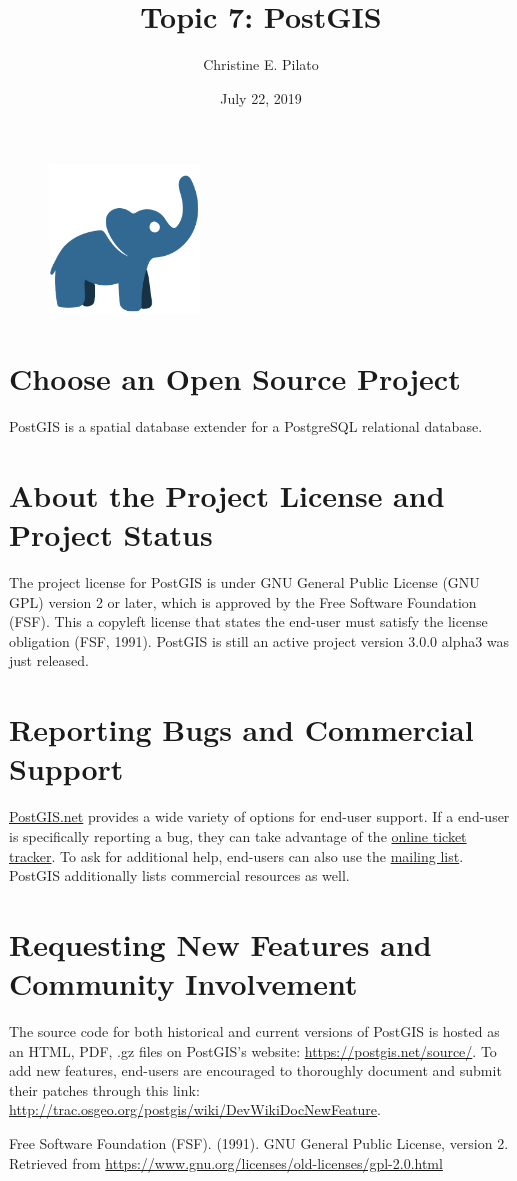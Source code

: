 \documentclass[11pt]{article}
\title{Topic 7: PostGIS}
\author{Christine E. Pilato}
\date{July 22, 2019}
\begin{document}
\begin{figure}
    \centering
    \includegraphics[width=4cm]{postgis.png}
\end{figure}
\maketitle

\section*{Choose an Open Source Project}
PostGIS is a spatial database extender for a PostgreSQL relational database.
\section*{About the Project License and Project Status}
The project license for PostGIS is under GNU General Public License (GNU GPL) version 2 or later, which is approved by the Free Software Foundation (FSF). This a copyleft license that states the end-user must satisfy the license obligation (FSF, 1991). PostGIS is still an active project \textemdash version 3.0.0 alpha3 was just released.
\section*{Reporting Bugs and Commercial Support}
\href{https://postgis.net/support/}{PostGIS.net} provides a wide variety of options for end-user support. If a end-user is specifically reporting a bug, they can take advantage of the \href{http://trac.osgeo.org/postgis}{online ticket tracker}. To ask for additional help, end-users can also use the \href{https://lists.osgeo.org/mailman/listinfo/postgis-users}{mailing list}. PostGIS additionally lists commercial resources as well.
\section*{Requesting New Features and Community Involvement}
The source code for both historical and current versions of PostGIS is hosted as an HTML, PDF, .gz files on PostGIS's website: \url{https://postgis.net/source/}. To add new features, end-users are encouraged to thoroughly document and submit their patches through this link: \url{http://trac.osgeo.org/postgis/wiki/DevWikiDocNewFeature}.

\begin{thebibliography}
 Free Software Foundation (FSF). (1991). GNU General Public License, version 2. Retrieved from \url{https://www.gnu.org/licenses/old-licenses/gpl-2.0.html}
\end{thebibliography}
\end{document}

